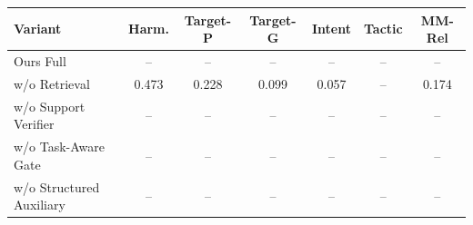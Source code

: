 \begin{tabular*}{0.98\textwidth}{@{\extracolsep{\fill}}lcccccc@{}}
\toprule
Variant & Harm. & Target-P & Target-G & Intent & Tactic & MM-Rel \\
\midrule
Ours Full                & -- & -- & -- & -- & -- & -- \\
w/o Retrieval            & 0.473 & 0.228 & 0.099 & 0.057 & -- & 0.174 \\
w/o Support Verifier     & -- & -- & -- & -- & -- & -- \\
w/o Task-Aware Gate      & -- & -- & -- & -- & -- & -- \\
w/o Structured Auxiliary & -- & -- & -- & -- & -- & -- \\
\bottomrule
\end{tabular*}
